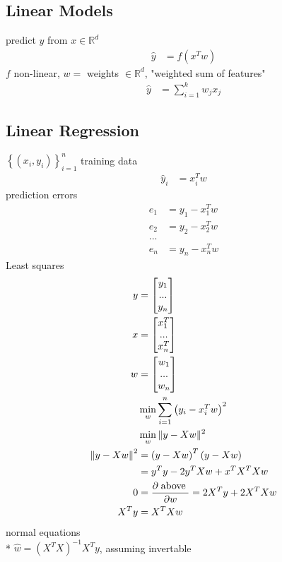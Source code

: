 \documentclass{article}
\begin{document}
\subsection{Linear Models}
predict $y $ from $x  \in \mathbb{R}^{d}$
\begin{align*}
\hat{y} &= f\left(x^{T} w\right)
\end{align*}
$f $ non-linear, $w  =$ weights $\in \mathbb{R}^{d}$, "weighted sum of features"
\begin{align*}
\hat{y} &= \displaystyle\sum_{i=1}^{k} w_{j} x_{j}
\end{align*}


\subsection{Linear Regression}
$\left\{\left(x_{i}, y_{i}\right)\right\}_{i=1}^{n}$ training data
\begin{align*}
\hat{y}_{i} &= x_{i}^{T} w 
\end{align*}
prediction errors
\begin{align*}
e_{1} &= y_{1} - x_{1}^{T} w 
\\ e_{2} &= y_{2} - x_{2}^{T} w 
\\ ... & 
\\ e_{n} &= y_{n} - x_{n}^{T} w 
\end{align*}
Least squares
\begin{align*}
y  &= \begin{bmatrix} y_{1} \\ ... \\ y_{n} \end{bmatrix}
\\ x  &= \begin{bmatrix} x_{1}^{T} \\ ... \\ x_{n}^{T} \end{bmatrix}
\\ w  &= \begin{bmatrix} w_{1} \\ ... \\ w_{n} \end{bmatrix}
\\ &\displaystyle\min_{w} \displaystyle\sum_{i=1}^{n} \left(y_{i} - x_{i}^{T} w\right)^{2}
\\ &\displaystyle\min_{w} \| y - X w \|^{2}
\\ \left\|y - X w\right\|^{2} &= \left(y - X w\right)^{T}\left(y - X w \right)
\\ &= y^{T} y - 2 y^{T} X w + x^{T} X^{T} X w 
\\ 0 &= \dfrac{\partial \text{\;above\;}}{\partial w} = 2 X^{T} y + 2 X^{T} X w 
\\ X^{T} y &= X^{T} X w 
\end{align*}
normal equations
\\* $\hat{w} = \left(X^{T} X\right)^{-1} X^{T} y $, assuming invertable
\end{document}
